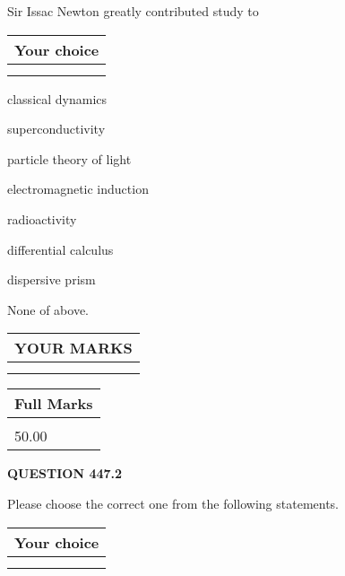 \documentclass[12pt]{article}
\begin{document}
  
Sir Issac Newton greatly contributed study to
  
  
\noindent\hspace{3.0in} \begin{tabular}{|l|}
\hline
Your choice \\
\hline
 \\ 
 \\ 
\hline
\end{tabular}
  
  
 
 
classical dynamics
 
 
superconductivity
 
 
particle theory of light
 
 
electromagnetic induction
 
 
radioactivity
 
 
differential calculus
 
 
dispersive prism
 
 
 None of above.
 
 
  
\vspace{0.2in}
  
\noindent\begin{tabular}{|l|}
\hline
 YOUR MARKS  \\
\hline
 \\ 
 \\ 
\hline
\end{tabular}
\hspace{0.05in} \begin{tabular}{|l|}
\hline
 Full Marks  \\
\hline
 \\ 
50.00 \\
\hline
\end{tabular}
{\textbf{\Large{QUESTION
447.2 
}}}
  
  
Please choose the correct one from the following statements.
  
  
\noindent\hspace{3.0in} \begin{tabular}{|l|}
\hline
Your choice \\
\hline
 \\ 
 \\ 
\hline
\end{tabular}
  
\end{document}
